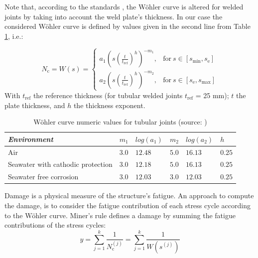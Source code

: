 Note that, according to the standards \cite{dnv_fatigue_2016}, the W\"ohler curve is altered for welded joints by taking into account the weld plate's thickness. 
In our case the considered  W\"ohler curve is defined by values given in the second line from Table \ref{tab:sn_table}, i.e.:

\begin{equation}
N_{\mathrm{c}} = W(s) = \left\{
    \begin{array}{ll}
        a_{1} \left(s (\frac{t}{t_{\mathrm{ref}}})^h\right) ^{-m_1}, & \mbox{for}~ s \in [s_{\mathrm{min}}, s_{\mathrm{e}}]\\
        a_{2} \left(s (\frac{t}{t_{\mathrm{ref}}})^h\right)^{-m_2}, & \mbox{for}~ s \in [s_{\mathrm{e}}, s_{\mathrm{max}}]
    \end{array}
\right.
\end{equation}
With $t_{\mathrm{ref}}$ the reference thickness (for tubular welded joints $t_{\mathrm{ref}}$ = 25 mm); $t$ the plate thickness, and $h$ the thickness exponent.


\begin{table}[h]
    \centering
    \caption{W\"ohler curve numeric values for tubular joints (source: \cite{dnv_fatigue_2016})}
    \begin{tabular}{l|l|l|l|l|l}
     \hline
     \textit{Environment} & $m_1$ & $log(a_1)$ & $m_2$ & $log(a_2)$ & $h$\\
     \hline
     Air & $3.0$ & $12.48$ & $5.0$ & $16.13$ & $0.25$\\
     Seawater with cathodic protection & $3.0$ & $12.18$ & $5.0$ & $16.13$ & $0.25$\\ Seawater free corrosion & $3.0$ & $12.03$ & $3.0$ & $12.03$ & $0.25$\\ 
    \end{tabular}
    \label{tab:sn_table}
\end{table}



Damage is a physical measure of the structure's fatigue. 
An approach to compute the damage, is to consider the fatigue contribution of each stress cycle according to the W\"ohler curve. 
Miner's rule defines a damage by summing the fatigue contributions of the stress cycles:
\begin{equation}
    y = \sum_{j=1}^{k} \frac{1}{N_{\mathrm{c}}^{(j)}} = \sum_{j=1}^{k} \frac{1}{W\left(s^{(j)}\right)}
    \label{miner}
\end{equation}


